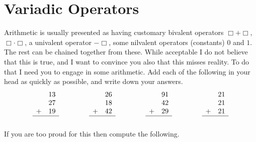 

\section{Variadic Operators}
Arithmetic is usually presented as having customary bivalent operators $\Box+\Box$, 
$\Box\cdot\Box$, a univalent operator $-\Box$, some nilvalent operators (constants)
$0$ and $1$.  The rest can be chained together from these.  While acceptable 
I do not believe that this is true, and I want to convince you also that this 
misses reality.  To do that I need you to engage in some arithmetic.
Add each of the following in your head as quickly as possible, and write down your answers.
\begin{equation*}
\begin{array}{cc}
    & 13\\
    & 27\\
   + & 19\\
\hline\\
\end{array}
\hspace{1.5cm}
\begin{array}{cc}
    & 26\\
    & 18\\
  + & 42\\
\hline\\
\end{array}
\hspace{1.5cm}
\begin{array}{cc}
    & 91\\
    & 42\\
  + & 29\\
\hline\\
\end{array}
\hspace{1.5cm}
\begin{array}{cc}
    & 21\\
    & 21\\
  + & 21\\
\hline\\
\end{array}
\end{equation*}
If you are too proud for this then compute the following.
